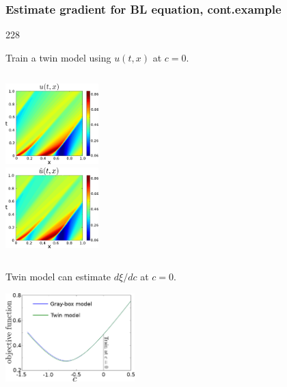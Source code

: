 \documentclass{beamer}
\newcommand{\barrow}{\item[\color{darkred}\ding{228}]}
\begin{document}
\begin{frame}
    \frametitle{Estimate gradient for BL equation, cont.\hfill\scriptsize{example}}\small
    \begin{dinglist}{228}
    \barrow Train a twin model using $u(t,x)$ at $c=0$.
    \begin{columns}
         \centering
            \includegraphics[width=3.6cm]{leftcol.png}\\
         \centering
            \includegraphics[width=3.6cm]{rightcol.png}\\
    \end{columns}
    \barrow Twin model can estimate ${d\xi} \slash {dc}$ at $c=0$.
    \begin{center}
        \includegraphics[width=5cm]{J_twin_vs_primal.png}
    \end{center}
    \end{dinglist}
\end{frame}
\end{document}

